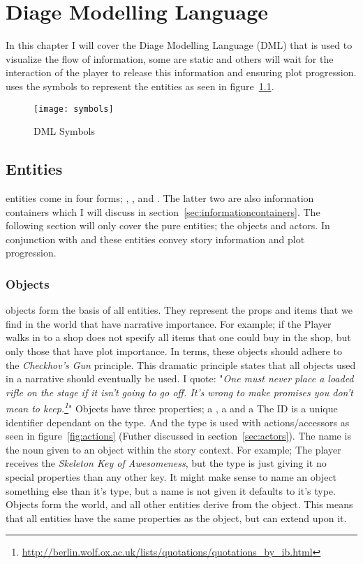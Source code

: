 \chapter{Diage Modelling Language}
In this chapter I will cover the Diage Modelling Language (DML) that is used to visualize the flow of information, some are static and others will wait for the interaction of the player to release this information and ensuring plot progression. \diage uses the symbols to represent the \diage entities as seen in figure~\ref{fig:DMLSymbols}. 
\begin{figure}[h]
	\texttt{[image: symbols]}
	\caption{DML Symbols}
	\label{fig:DMLSymbols}	
\end{figure}
\section{Entities}
\diage entities come in four forms; , ,  and . The latter two are also information containers which I will discuss in section~\ref{sec:informationcontainers}. The following section will only cover the pure entities; the objects and actors. In conjunction with  and  these entities convey story information and plot progression. 
\subsection{Objects}
\diage objects form the basis of all entities. They represent the props and items that we find in the world that have narrative importance. For example; if the Player walks in to a shop \diage does not specify all items that one could buy in the shop, but only those that have plot importance. In terms, these objects should adhere to the \textit{Checkhov's Gun} principle. This dramatic principle states that all objects used in a narrative should eventually be used. I quote: "\textit{One must never place a loaded rifle on the stage if it isn't going to go off. It's wrong to make promises you don't mean to keep.\footnote{\url{http://berlin.wolf.ox.ac.uk/lists/quotations/quotations_by_ib.html}}}"
Objects have three properties; a , a  and a  The ID is a unique identifier dependant on the type. And the type is used with actions/accessors as seen in figure~\ref{fig:actions} (Futher discussed in section~\ref{sec:actors}). The name is the noun given to an object within the story context. For example; The player receives the \textit{Skeleton Key of Awesomeness}, but the type is just  giving it no special properties than any other key. It might make sense to name an object something else than it's type, but a name is not given it defaults to it's type. 
Objects form the world, and all other entities derive from the \diage object. This means that all entities have the same properties as the object, but can extend upon it.

